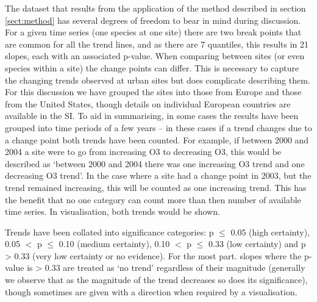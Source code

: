 \documentclass[journal abbreviation, manuscript]{copernicus}
\begin{document}
The dataset that results from the application of the method described in section \ref{sect:method} has several degrees of freedom to bear in mind during discussion. For a given time series (one species at one site) there are two break points that are common for all the trend lines, and as there are 7 quantiles, this results in 21 slopes, each with an associated p-value. When comparing between sites (or even species within a site) the change points can differ. This is necessary to capture the changing trends observed at urban sites but does complicate describing them. For this discussion we have grouped the sites into those from Europe and those from the United States, though details on individual European countries are available in the SI. 
To aid in summarising, in some cases the results have been grouped into time periods of a few years – in these cases if a trend changes due to a change point both trends have been counted. For example, if between 2000 and 2004 a site were to go from increasing O3 to decreasing O3, this would be described as ‘between 2000 and 2004 there was one increasing O3 trend and one decreasing O3 trend’. In the case where a site had a change point in 2003, but the trend remained increasing, this will be counted as one increasing trend. This has the benefit that no one category can count more than then number of available time series. In visualisation, both trends would be shown.

Trends have been collated into significance categories: p $\le$ 0.05 (high certainty), 0.05 $<$ p $\le$ 0.10 (medium certainty), 0.10 $<$ p $\le$ 0.33 (low certainty) and p > 0.33 (very low certainty or no evidence). For the most part. slopes where the p-value is > 0.33 are treated as ‘no trend’ regardless of their magnitude (generally we observe that as the magnitude of the trend decreases so does its significance), though sometimes are given with a direction when required by a visualisation.
\end{document}
